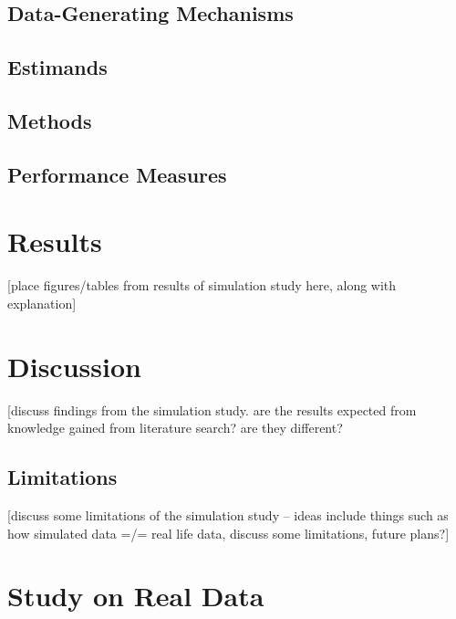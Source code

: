 \documentclass[12pt, twoside]{amherstthesis}
\begin{document}
\hypertarget{data_generating_mechanisms}{%
\subsection{Data-Generating Mechanisms}\label{data_generating_mechanisms}}

\hypertarget{estimands}{%
\subsection{Estimands}\label{estimands}}

\hypertarget{methods}{%
\subsection{Methods}\label{methods}}

\hypertarget{performance_measures}{%
\subsection{Performance Measures}\label{performance_measures}}

\hypertarget{results}{%
\section{Results}\label{results}}

{[}place figures/tables from results of simulation study here, along with explanation{]}

\hypertarget{discussion}{%
\section{Discussion}\label{discussion}}

{[}discuss findings from the simulation study. are the results expected from knowledge gained from literature search? are they different?

\hypertarget{limitations}{%
\subsection{Limitations}\label{limitations}}

{[}discuss some limitations of the simulation study -- ideas include things such as how simulated data =/= real life data, discuss some limitations, future plans?{]}

\hypertarget{real_data}{%
\section{Study on Real Data}\label{real_data}}
\end{document}
